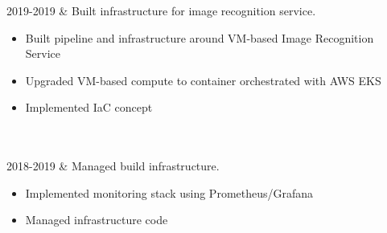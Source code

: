 \documentclass[changecolor={47, 79, 79}]{cv-roald}
\begin{document}
\begin{tabularcv}
2019-2019   &   
                \newline Built infrastructure for image recognition service.
                \begin{itemize}
                  \item Built pipeline and infrastructure around VM-based Image Recognition Service
                  \item Upgraded VM-based compute to container orchestrated with AWS EKS
                  \item Implemented IaC concept
                \end{itemize} 
                \\
                \\
                
2018-2019   &   
                \newline Managed build infrastructure.
                \begin{itemize}
                  \item Implemented monitoring stack using Prometheus/Grafana
                  \item Managed infrastructure code
                \end{itemize} 
                \\
                \\
                

\end{tabularcv}
\end{document}
